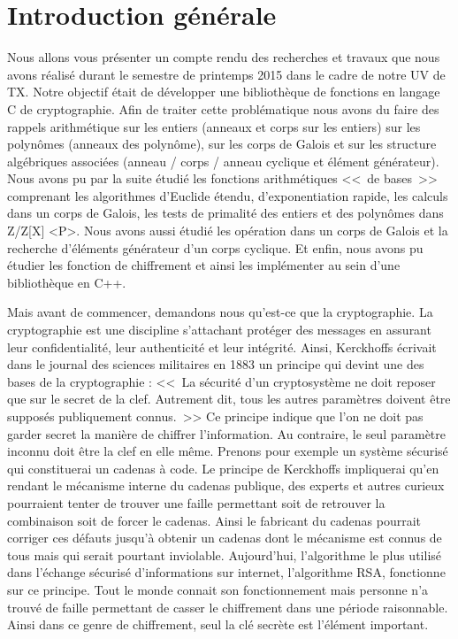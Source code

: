 \chapter{Introduction générale}


Nous allons vous présenter un compte rendu des recherches et travaux que nous avons réalisé durant le semestre de printemps 2015 dans le cadre de notre UV de TX. Notre objectif était de développer une bibliothèque de fonctions en langage C de cryptographie. Afin de traiter cette problématique nous avons du faire des rappels arithmétique sur les entiers (anneaux et corps sur les entiers) sur les polynômes (anneaux des polynôme), sur les corps de Galois et sur les structure algébriques associées (anneau / corps / anneau cyclique et élément générateur). 
Nous avons pu par la suite étudié les fonctions arithmétiques <<~de bases~>> comprenant les algorithmes d'Euclide étendu, d'exponentiation rapide, les calculs dans un corps de Galois, les tests de primalité des entiers et des polynômes dans Z/Z[X] <P>. Nous avons aussi étudié les opération dans un corps de Galois et la recherche d'éléments générateur d'un corps cyclique. Et enfin, nous avons pu étudier les fonction de chiffrement et ainsi les implémenter au sein d’une bibliothèque en C++. 


Mais avant de commencer, demandons nous qu’est-ce que la cryptographie. La cryptographie est une discipline s’attachant protéger des messages en assurant leur confidentialité, leur authenticité et leur intégrité. Ainsi, Kerckhoffs écrivait dans le journal des sciences militaires en 1883 un principe qui devint une des bases de la cryptographie :  <<~La sécurité d’un cryptosystème ne doit reposer que sur le secret de la clef. Autrement dit, tous les autres paramètres doivent être supposés publiquement connus.~>> Ce principe indique que l’on ne doit pas garder secret la manière de chiffrer l’information. Au contraire, le seul paramètre inconnu doit être la clef en elle même. Prenons pour exemple un système sécurisé qui constituerai un cadenas à code. Le principe de Kerckhoffs impliquerai qu’en rendant le mécanisme interne du cadenas publique, des experts et autres curieux pourraient tenter de trouver une faille permettant soit de retrouver la combinaison soit de forcer le cadenas. Ainsi le fabricant du cadenas pourrait corriger ces défauts jusqu’à obtenir un cadenas dont le mécanisme est connus de tous mais qui serait pourtant inviolable. Aujourd’hui, l’algorithme le plus utilisé dans l’échange sécurisé d’informations sur internet, l’algorithme RSA, fonctionne sur ce principe. Tout le monde connait son fonctionnement mais personne n’a trouvé de faille permettant de casser le chiffrement dans une période raisonnable. Ainsi dans ce genre de chiffrement, seul la clé secrète est l’élément important.







